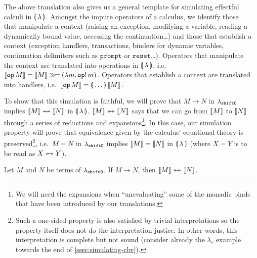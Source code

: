 The above translation also gives us a general template for simulating
effectful calculi in $\llparenthesis \, \lambda \, \rrparenthesis$. Amongst the impure operators of a
calculus, we identify those that manipulate a context (raising an
exception, modifying a variable, reading a dynamically bound value,
accessing the continuation\ldots) and those that establish a context
(exception handlers, transactions, binders for dynamic variables,
continuation delimiters such as $\texttt{prompt}$ or
$\texttt{reset}$\ldots). Operators that manipulate the context are
translated into operations in $\llparenthesis \, \lambda \, \rrparenthesis$,
i.e.\ $\llbracket \texttt{op}\,M \rrbracket = \llbracket M \rrbracket \mathbin{\gg\!=}
(\lambda m.\, \mathtt{op}!\,m)$. Operators that establish a context are
translated into handlers, i.e.\ $\llbracket \texttt{op}\,M \rrbracket =
\llparenthesis \, \ldots \, \rrparenthesis\,\llbracket M \rrbracket$.

To show that this simulation is faithful, we will prove that $M \to N$ in
$\lambda_{\mathtt{shift0}}$ implies $\llbracket M \rrbracket \twoheadleftarrow \mathrel{\mkern-15mu} \twoheadrightarrow \llbracket N \rrbracket$ in
$\llparenthesis \, \lambda \, \rrparenthesis$. $\llbracket M \rrbracket \twoheadleftarrow \mathrel{\mkern-15mu} \twoheadrightarrow \llbracket N \rrbracket$ says that we can go from
$\llbracket M \rrbracket$ to $\llbracket N \rrbracket$ through a series of reductions and
expansions\footnote{We will need the expansions when ``unevaluating'' some
  of the monadic binds that have been introduced by our translations.}. In
this case, our simulation property will prove that equivalence given by the
calculus' equational theory is preserved\footnote{Such a one-sided property
  is also satisfied by trivial interpretations so the property itself does
  not do the interpretation justice. In other words, this interpretation is
  complete but not sound (consider already the $\lambda_v$ example towards
  the end of \ref{ssec:simulating-cbv}). }, i.e.\ $M = N$ in $\lambda_{\mathtt{shift0}}$ implies $\llbracket M \rrbracket
= \llbracket N \rrbracket$ in $\llparenthesis \, \lambda \, \rrparenthesis$ (where $X = Y$ is to be read as $X
\twoheadleftarrow \mathrel{\mkern-15mu} \twoheadrightarrow Y$).

\begin{property}
  Let $M$ and $N$ be terms of $\lambda_{\mathtt{shift0}}$. If $M \to N$, then
  $\llbracket M \rrbracket \twoheadleftarrow \mathrel{\mkern-15mu} \twoheadrightarrow \llbracket N \rrbracket$.
\end{property}


